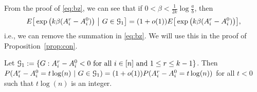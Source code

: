 \documentclass{article}
\begin{document}
\begin{remark}
From the proof of \eqref{eq:bz}, we can see that if $0<\beta<\frac{1}{2k}\log\frac{a}{b}$, then
\begin{equation} \label{eq:pl}
E \big[  \exp\big(k\beta (A^r_i-A^0_i) \big) ~\big|~ G\in\mathcal{G}_1 \big] 
= (1+o(1)) E \big[  \exp\big(k\beta (A^r_i-A^0_i) \big) \big] ,
\end{equation}
i.e., we can remove the summation in \eqref{eq:bz}. We will use this in the proof of Proposition~\ref{prop:con}.
\end{remark}



\begin{lemma}  \label{lm:5t}
Let $\mathcal{G}_1:=\{G:A^r_i-A^0_i<0\text{~for all~}i\in[n]\text{~and~}1\leq r \leq k-1\}$. Then $P(A^r_i-A^0_i= t\log(n)~|~G\in\mathcal{G}_1)= (1+o(1))P(A^r_i-A^0_i= t\log(n))$ for all $t<0$ such that $t\log(n)$ is an integer.
\end{lemma}
\end{document}
